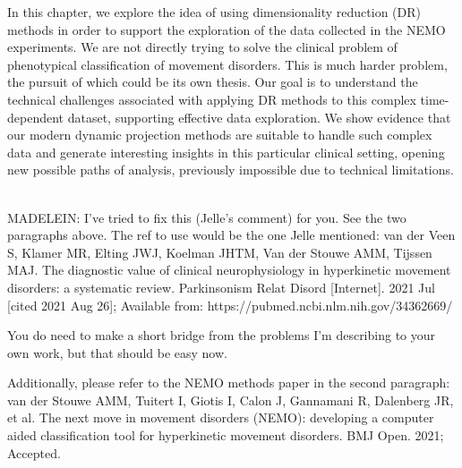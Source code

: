 In this chapter, we explore the idea of using dimensionality reduction (DR) methods in order to support the exploration of the data collected in the NEMO experiments. We are not directly trying to solve the clinical problem of phenotypical classification of movement disorders. This is much harder problem, the pursuit of which could be its own thesis. Our goal is to understand the technical challenges associated with applying DR methods to this complex time-dependent dataset, supporting effective data exploration. We show evidence that our modern dynamic projection methods are suitable to handle such complex data and generate interesting insights in this particular clinical setting, opening new possible paths of analysis, previously impossible due to technical limitations. 

\\



MADELEIN: 
I've tried to fix this (Jelle's comment) for you. See the two paragraphs above.  The ref to use would be the one Jelle mentioned: 
van der Veen S, Klamer MR, Elting JWJ, Koelman JHTM, Van der Stouwe AMM, Tijssen MAJ. The diagnostic value of clinical neurophysiology in hyperkinetic movement disorders: a systematic review. Parkinsonism Relat Disord [Internet]. 2021 Jul [cited 2021 Aug 26]; Available from: https://pubmed.ncbi.nlm.nih.gov/34362669/

You do need to make a short bridge from the problems I'm describing to your own work, but that should be easy now.

Additionally, please refer to the NEMO methods paper in the second paragraph: 
van der Stouwe AMM, Tuitert I, Giotis I, Calon J, Gannamani R, Dalenberg JR, et al. The next move in movement disorders (NEMO): developing a computer aided classification tool for hyperkinetic movement disorders. BMJ Open. 2021; Accepted. 


